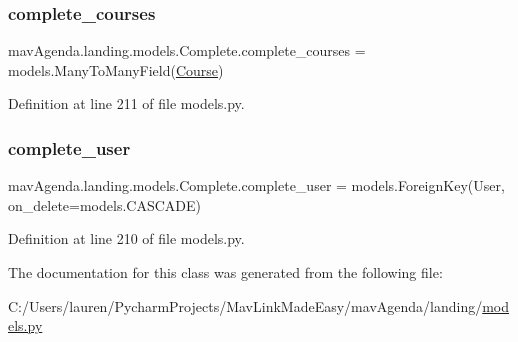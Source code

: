 \subsubsection{\texorpdfstring{complete\+\_\+courses}{complete\_courses}}
{\footnotesize\ttfamily mav\+Agenda.\+landing.\+models.\+Complete.\+complete\+\_\+courses = models.\+Many\+To\+Many\+Field(\mbox{\hyperlink{classmavAgenda_1_1landing_1_1models_1_1Course}{Course}})\hspace{0.3cm}{\ttfamily [static]}}



Definition at line 211 of file models.\+py.

\mbox{\label{classmavAgenda_1_1landing_1_1models_1_1Complete_a5956fdb08e5e4809ee8691490cfe6f64}} 
\subsubsection{\texorpdfstring{complete\+\_\+user}{complete\_user}}
{\footnotesize\ttfamily mav\+Agenda.\+landing.\+models.\+Complete.\+complete\+\_\+user = models.\+Foreign\+Key(User, on\+\_\+delete=models.\+C\+A\+S\+C\+A\+DE)\hspace{0.3cm}{\ttfamily [static]}}



Definition at line 210 of file models.\+py.



The documentation for this class was generated from the following file\+:\begin{DoxyCompactItemize}
\item 
C\+:/\+Users/lauren/\+Pycharm\+Projects/\+Mav\+Link\+Made\+Easy/mav\+Agenda/landing/\mbox{\hyperlink{models_8py}{models.\+py}}\end{DoxyCompactItemize}
